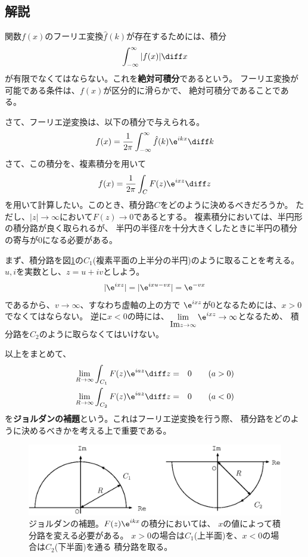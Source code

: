 \subsection{解説}

関数$f(x)$のフーリエ変換$\hat{f}(k)$が存在するためには、積分
\begin{equation}
  \int_{-\infty}^{\infty} |f(x)|  \diff x
\end{equation}
が有限でなくてはならない。これを{\bf 絶対可積分}であるという。
フーリエ変換が可能である条件は、$f(x)$が区分的に滑らかで、
絶対可積分であることである。

さて、フーリエ逆変換は、以下の積分で与えられる。
\begin{equation}
  f(x) = \frac{1}{2\pi}\int_{-\infty}^{\infty} \hat{f}(k) \e^{ikx} \diff k
\end{equation}
さて、この積分を、複素積分を用いて
\begin{equation}
  f(x) = \frac{1}{2\pi} \int_{C} F(z) \e^{ixz} \diff z
\end{equation}
を用いて計算したい。このとき、積分路$C$をどのように決めるべきだろうか。
ただし、$|z| \rightarrow \infty$において$F(z) \rightarrow 0$であるとする。
複素積分においては、半円形の積分路が良く取られるが、
半円の半径$R$を十分大きくしたときに半円の積分の寄与が$0$になる必要がある。

まず、積分路を図\ref{fig_jordan}の$C_1$(複素平面の上半分の半円)のように取ることを考える。
$u,i$を実数とし、$z = u + iv$としよう。
\begin{equation}
  |\e^{ixz}| = |\e^{ixu - vx}| = \e^{- vx}
\end{equation}
であるから、$v \rightarrow \infty$、すなわち虚軸の上の方で
$\e^{ixz}$が$0$となるためには、$x>0$でなくてはならない。
逆に$x<0$の時には、$\displaystyle \lim_{\mbox{Im} z \rightarrow \infty} \e^{ixz} \rightarrow \infty$となるため、
積分路を$C_2$のように取らなくてはいけない。

以上をまとめて、
\begin{eqnarray}
  \lim_{R\rightarrow \infty}  \int_{C_1} F(z) \e^{iaz} \diff z &=& 0 \qquad (a>0)\\
  \lim_{R\rightarrow \infty}  \int_{C_2} F(z) \e^{iaz} \diff z &=& 0 \qquad (a<0)
\end{eqnarray}
を{\bf ジョルダンの補題}という。これはフーリエ逆変換を行う際、
積分路をどのように決めるべきかを考える上で重要である。

\begin{figure}[htbp]
  \begin{center}
    \includegraphics[width=.8\linewidth]{fig/jordan.eps}
  \end{center}
  \caption{
    ジョルダンの補題。$F(z)\e^{ikx}$の積分においては、
    $x$の値によって積分路を変える必要がある。
    $x>0$の場合は$C_1$(上半面)を、$x<0$の場合は$C_2$(下半面)を通る
    積分路を取る。
  }
  \label{fig_jordan}
\end{figure}


